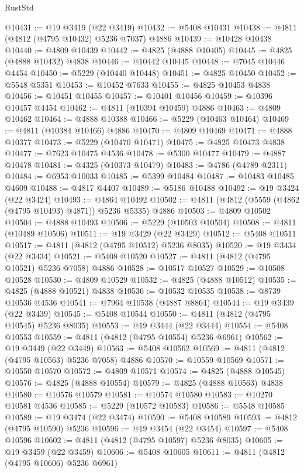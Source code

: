 \begin{lexlean}{RustStd}
\begin{coremodule}
@10431 := @19 @3419 (@22 @3419)
@10432 := @5408 @10431
@10438 := @4811 (@4812 (@4795 @10432) @5236 @7037) @4886
@10439 := @10428 @10438
@10440 := @4809 @10439
@10442 := @4825 (@4888 @10405)
@10445 := @4825 (@4888 @10432) @4838
@10446 := @10442 @10445
@10448 := @7045 @10446 @4454
@10450 := @5229 (@10440 @10448)
@10451 := @4825 @10450
@10452 := @5548 @5351
@10453 := @10452 @7633
@10455 := @4825 @10453 @4838
@10456 := @10451 @10455
@10457 := @10401 @10456
@10459 := @10396 @10457 @4454
@10462 := @4811 (@10394 @10459) @4886
@10463 := @4809 @10462
@10464 := @4888 @10388
@10466 := @5229 (@10463 @10464)
@10469 := @4811 (@10384 @10466) @4886
@10470 := @4809 @10469
@10471 := @4888 @10377
@10473 := @5229 (@10470 @10471)
@10475 := @4825 @10473 @4838
@10477 := @7623 @10475 @4536
@10478 := @5300 @10477
@10479 := @4887 @10478
@10481 := @4325 (@10373 @10479)
@10483 := @4786 (@4789 @2311)
@10484 := @6953 @10033
@10485 := @5399 @10484
@10487 := @10483 @10485 @4609
@10488 := @4817 @4407
@10489 := @5186 @10488
@10492 := @19 @3424 (@22 @3424)
@10493 := @4864 @10492
@10502 := @4811 (@4812 (@5559 (@4862 (@4795 @10493) @4871)) @5236 @5335) @4886
@10503 := @4809 @10502
@10504 := @4888 @10493
@10506 := @5229 (@10503 @10504)
@10508 := @4811 (@10489 @10506)
@10511 := @19 @3429 (@22 @3429)
@10512 := @5408 @10511
@10517 := @4811 (@4812 (@4795 @10512) @5236 @8035)
@10520 := @19 @3434 (@22 @3434)
@10521 := @5408 @10520
@10527 := @4811 (@4812 (@4795 @10521) @5236 @7058) @4886
@10528 := @10517 @10527
@10529 := @10508 @10528
@10530 := @4809 @10529
@10532 := @4825 (@4888 @10512)
@10535 := @4825 (@4888 @10521) @4838
@10536 := @10532 @10535
@10538 := @8739 @10536 @4536
@10541 := @7964 @10538 (@4887 @8864)
@10544 := @19 @3439 (@22 @3439)
@10545 := @5408 @10544
@10550 := @4811 (@4812 (@4795 @10545) @5236 @8035)
@10553 := @19 @3444 (@22 @3444)
@10554 := @5408 @10553
@10559 := @4811 (@4812 (@4795 @10554) @5236 @6961)
@10562 := @19 @3449 (@22 @3449)
@10563 := @5408 @10562
@10569 := @4811 (@4812 (@4795 @10563) @5236 @7058) @4886
@10570 := @10559 @10569
@10571 := @10550 @10570
@10572 := @4809 @10571
@10574 := @4825 (@4888 @10545)
@10576 := @4825 (@4888 @10554)
@10579 := @4825 (@4888 @10563) @4838
@10580 := @10576 @10579
@10581 := @10574 @10580
@10583 := @10270 @10581 @4536
@10585 := @5229 (@10572 @10583)
@10586 := @5548 @10585
@10589 := @19 @3474 (@22 @3474)
@10590 := @5408 @10589
@10593 := @4812 (@4795 @10590) @5236
@10596 := @19 @3454 (@22 @3454)
@10597 := @5408 @10596
@10602 := @4811 (@4812 (@4795 @10597) @5236 @8035)
@10605 := @19 @3459 (@22 @3459)
@10606 := @5408 @10605
@10611 := @4811 (@4812 (@4795 @10606) @5236 @6961)

\end{coremodule}
\end{lexlean}
